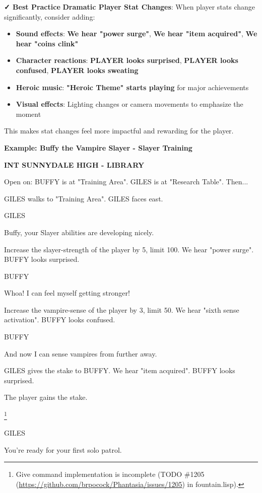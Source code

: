 \documentclass[11pt,letterpaper,oldstylefigures]{memoir}
\newcommand{\slugline}[1]{\nobreak\textbf{\MakeUppercase{#1}}\par\nobreak\vspace{1\baselineskip}}
\newcommand{\speaker}[1]{\nobreak\hspace*{0.333\textwidth}\MakeUppercase{#1}\par\nobreak\vspace{0.5\baselineskip}}
\newcommand{\dialogue}[1]{\nobreak\hspace*{0.25\textwidth}\begin{minipage}{0.5\textwidth}#1\end{minipage}\par\vspace{1\baselineskip}}
\newcommand{\stagedir}[1]{#1\par\vspace{1\baselineskip}}
\newenvironment{FountainExample}
  {\begingroup
  \ttfamily\small
   \setlength{\parindent}{0pt}
  \setlength{\parskip}{0.5em}
  \allowdisplaybreaks
  \setlength{\displaywidowpenalty}{0}
  \setlength{\widowpenalty}{0}
  \setlength{\clubpenalty}{0}
  \setlength{\interlinepenalty}{0}
}
  {\endgroup}
\newcommand{\fountain}[1]{\textbf{#1}}
\begin{document}
\textbf{✓ Best Practice}
\textbf{Dramatic Player Stat Changes}: When player stats change significantly, consider adding:
\begin{itemize}
\item \textbf{Sound effects}: \fountain{We hear "power surge"}, \fountain{We hear "item acquired"}, \fountain{We hear "coins clink"}
\item \textbf{Character reactions}: \fountain{PLAYER looks surprised}, \fountain{PLAYER looks confused}, \fountain{PLAYER looks sweating}
\item \textbf{Heroic music}: \fountain{"Heroic Theme" starts playing} for major achievements
\item \textbf{Visual effects}: Lighting changes or camera movements to emphasize the moment
\end{itemize}
This makes stat changes feel more impactful and rewarding for the player.


\textbf{Example: Buffy the Vampire Slayer - Slayer Training}

\begin{FountainExample}
\slugline{INT SUNNYDALE HIGH - LIBRARY}

\stagedir{Open on: BUFFY is at "Training Area". GILES is at "Research Table". Then...}

\stagedir{GILES walks to "Training Area". GILES faces east.}

\speaker{GILES}
\dialogue{Buffy, your Slayer abilities are developing nicely.}

\stagedir{Increase the slayer-strength of the player by 5, limit 100. We hear "power surge". BUFFY looks surprised.}

\speaker{BUFFY}
\dialogue{Whoa! I can feel myself getting stronger!}

\stagedir{Increase the vampire-sense of the player by 3, limit 50. We hear "sixth sense activation". BUFFY looks confused.}

\speaker{BUFFY}
\dialogue{And now I can sense vampires from further away.}

\stagedir{GILES gives the stake to BUFFY. We hear "item acquired". BUFFY looks surprised.}
\stagedir{The player gains the stake.}\footnote{Give command implementation is incomplete (TODO \#1205 (\href{https://github.com/brpocock/Phantasia/issues/1205}{https://github.com/brpocock/Phantasia/issues/1205}) in fountain.lisp).}

\speaker{GILES}
\dialogue{You're ready for your first solo patrol.}
\end{FountainExample}
\end{document}
